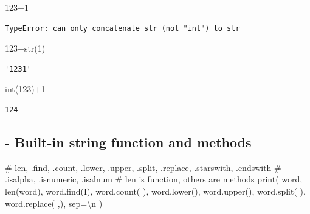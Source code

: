 \documentclass[
  a4paper,
  DIV=11,
  numbers=noendperiod]{scrreprt}
\newenvironment{Shaded}{\begin{snugshade}}{\end{snugshade}}
\newcommand{\BuiltInTok}[1]{\textcolor[rgb]{0.00,0.23,0.31}{#1}}
\newcommand{\CharTok}[1]{\textcolor[rgb]{0.13,0.47,0.30}{#1}}
\newcommand{\CommentTok}[1]{\textcolor[rgb]{0.37,0.37,0.37}{#1}}
\newcommand{\DecValTok}[1]{\textcolor[rgb]{0.68,0.00,0.00}{#1}}
\newcommand{\NormalTok}[1]{\textcolor[rgb]{0.00,0.23,0.31}{#1}}
\newcommand{\OperatorTok}[1]{\textcolor[rgb]{0.37,0.37,0.37}{#1}}
\newcommand{\StringTok}[1]{\textcolor[rgb]{0.13,0.47,0.30}{#1}}
\begin{document}
\begin{Shaded}
\begin{Highlighting}[]
\CommentTok{\textquotesingle{}123\textquotesingle{}}\OperatorTok{+}\DecValTok{1}
\end{Highlighting}
\end{Shaded}

\begin{verbatim}
TypeError: can only concatenate str (not "int") to str
\end{verbatim}

\begin{Shaded}
\begin{Highlighting}[]
\CommentTok{\textquotesingle{}123\textquotesingle{}}\OperatorTok{+}\BuiltInTok{str}\NormalTok{(}\DecValTok{1}\NormalTok{)}
\end{Highlighting}
\end{Shaded}

\begin{verbatim}
'1231'
\end{verbatim}

\begin{Shaded}
\begin{Highlighting}[]
\BuiltInTok{int}\NormalTok{(}\StringTok{\textquotesingle{}123\textquotesingle{}}\NormalTok{)}\OperatorTok{+}\DecValTok{1}
\end{Highlighting}
\end{Shaded}

\begin{verbatim}
124
\end{verbatim}

\subsection{- Built-in string function and
methods}\label{built-in-string-function-and-methods}

\begin{Shaded}
\begin{Highlighting}[]
\CommentTok{\# len, .find, .count, .lower, .upper, .split, .replace, .starswith, .endswith}
\CommentTok{\# .isalpha, .isnumeric, .isalnum}
\CommentTok{\# len is function, others are methods}
\BuiltInTok{print}\NormalTok{(}
\NormalTok{    word,}
    \BuiltInTok{len}\NormalTok{(word),}
\NormalTok{    word.find(}\StringTok{\textquotesingle{}I\textquotesingle{}}\NormalTok{),}
\NormalTok{    word.count(}\StringTok{\textquotesingle{} \textquotesingle{}}\NormalTok{),}
\NormalTok{    word.lower(),}
\NormalTok{    word.upper(),}
\NormalTok{    word.split(}\StringTok{\textquotesingle{} \textquotesingle{}}\NormalTok{),}
\NormalTok{    word.replace(}\StringTok{\textquotesingle{} \textquotesingle{}}\NormalTok{,}\StringTok{\textquotesingle{}{-}\textquotesingle{}}\NormalTok{),}
\NormalTok{    sep}\OperatorTok{=}\StringTok{\textquotesingle{}}\CharTok{\textbackslash{}n}\StringTok{\textquotesingle{}}
\NormalTok{)}
\end{Highlighting}
\end{Shaded}
\end{document}
